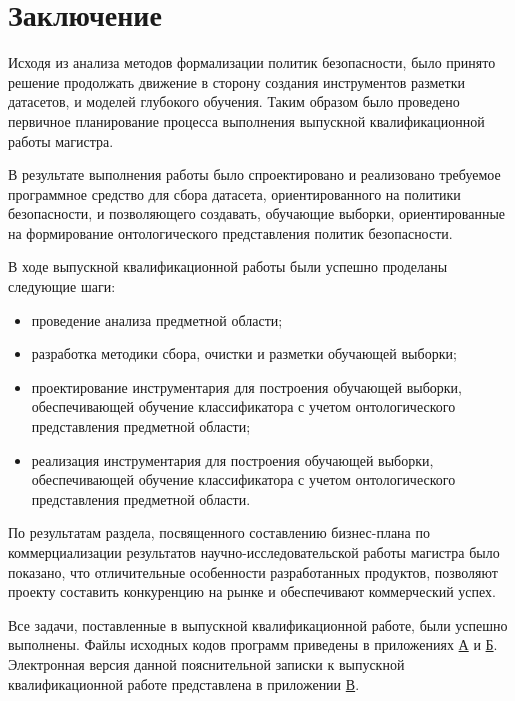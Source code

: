 \documentclass[../main]{subfiles}
\begin{document}
\newpage
{}
{}
\section*{Заключение}

Исходя из анализа методов формализации политик безопасности, было принято решение продолжать движение в сторону создания инструментов разметки датасетов, и моделей глубокого обучения. Таким образом было проведено первичное планирование процесса выполнения выпускной квалификационной работы магистра.

В результате выполнения работы было спроектировано и реализовано требуемое программное средство для сбора датасета, ориентированного на политики безопасности, и позволяющего создавать, обучающие выборки, ориентированные на формирование онтологического представления политик безопасности.

В ходе выпускной квалификационной работы были успешно проделаны следующие шаги:
\begin{itemize}
    \item проведение анализа предметной области;
    \item разработка методики сбора, очистки и разметки обучающей выборки;
    \item проектирование инструментария для построения обучающей выборки, обеспечивающей обучение классификатора с учетом онтологического представления предметной области;
    \item реализация инструментария для построения обучающей выборки, обеспечивающей обучение классификатора с учетом онтологического представления предметной области.
\end{itemize}

По результатам раздела, посвященного составлению бизнес-плана по коммерциализации результатов научно-исследовательской работы магистра было показано, что отличительные особенности разработанных продуктов, позволяют проекту составить конкуренцию на рынке и обеспечивают коммерческий успех.

Все задачи, поставленные в выпускной квалификационной работе, были успешно выполнены. Файлы исходных кодов программ приведены в приложениях \hyperref[sec:appendix1]{А} и \hyperref[sec:appendix2]{Б}. Электронная версия данной  пояснительной записки к выпускной квалификационной работе представлена в приложении \hyperref[sec:appendix3]{В}.
\end{document}
